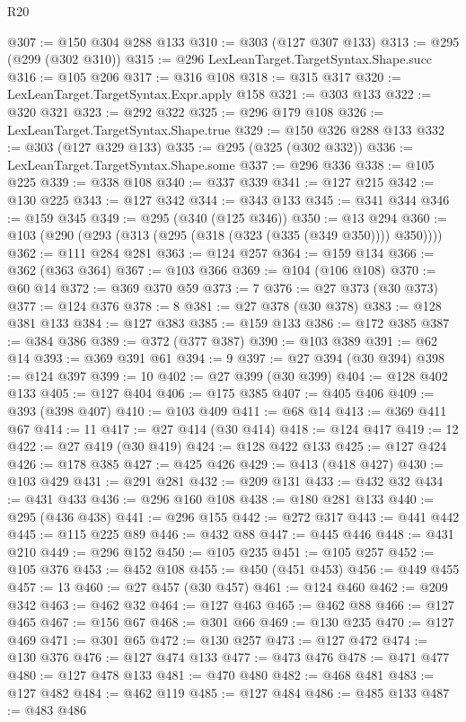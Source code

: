 \begin{lexlean}{R20}
\begin{coremodule}
@307 := @150 @304 @288 @133
@310 := @303 (@127 @307 @133)
@313 := @295 (@299 (@302 @310))
@315 := @296 LexLeanTarget.TargetSyntax.Shape.succ
@316 := @105 @206
@317 := @316 @108
@318 := @315 @317
@320 := LexLeanTarget.TargetSyntax.Expr.apply @158
@321 := @303 @133
@322 := @320 @321
@323 := @292 @322
@325 := @296 @179 @108
@326 := LexLeanTarget.TargetSyntax.Shape.true
@329 := @150 @326 @288 @133
@332 := @303 (@127 @329 @133)
@335 := @295 (@325 (@302 @332))
@336 := LexLeanTarget.TargetSyntax.Shape.some
@337 := @296 @336
@338 := @105 @225
@339 := @338 @108
@340 := @337 @339
@341 := @127 @215
@342 := @130 @225
@343 := @127 @342
@344 := @343 @133
@345 := @341 @344
@346 := @159 @345
@349 := @295 (@340 (@125 @346))
@350 := @13 @294
@360 := @103 (@290 (@293 (@313 (@295 (@318 (@323 (@335 (@349 @350)))) @350))))
@362 := @111 @284 @281
@363 := @124 @257
@364 := @159 @134
@366 := @362 (@363 @364)
@367 := @103 @366
@369 := @104 (@106 @108)
@370 := @60 @14
@372 := @369 @370 @59
@373 := 7
@376 := @27 @373 (@30 @373)
@377 := @124 @376
@378 := 8
@381 := @27 @378 (@30 @378)
@383 := @128 @381 @133
@384 := @127 @383
@385 := @159 @133
@386 := @172 @385
@387 := @384 @386
@389 := @372 (@377 @387)
@390 := @103 @389
@391 := @62 @14
@393 := @369 @391 @61
@394 := 9
@397 := @27 @394 (@30 @394)
@398 := @124 @397
@399 := 10
@402 := @27 @399 (@30 @399)
@404 := @128 @402 @133
@405 := @127 @404
@406 := @175 @385
@407 := @405 @406
@409 := @393 (@398 @407)
@410 := @103 @409
@411 := @68 @14
@413 := @369 @411 @67
@414 := 11
@417 := @27 @414 (@30 @414)
@418 := @124 @417
@419 := 12
@422 := @27 @419 (@30 @419)
@424 := @128 @422 @133
@425 := @127 @424
@426 := @178 @385
@427 := @425 @426
@429 := @413 (@418 @427)
@430 := @103 @429
@431 := @291 @281
@432 := @209 @131
@433 := @432 @32
@434 := @431 @433
@436 := @296 @160 @108
@438 := @180 @281 @133
@440 := @295 (@436 @438)
@441 := @296 @155
@442 := @272 @317
@443 := @441 @442
@445 := @115 @225 @89
@446 := @432 @88
@447 := @445 @446
@448 := @431 @210
@449 := @296 @152
@450 := @105 @235
@451 := @105 @257
@452 := @105 @376
@453 := @452 @108
@455 := @450 (@451 @453)
@456 := @449 @455
@457 := 13
@460 := @27 @457 (@30 @457)
@461 := @124 @460
@462 := @209 @342
@463 := @462 @32
@464 := @127 @463
@465 := @462 @88
@466 := @127 @465
@467 := @156 @67
@468 := @301 @66
@469 := @130 @235
@470 := @127 @469
@471 := @301 @65
@472 := @130 @257
@473 := @127 @472
@474 := @130 @376
@476 := @127 @474 @133
@477 := @473 @476
@478 := @471 @477
@480 := @127 @478 @133
@481 := @470 @480
@482 := @468 @481
@483 := @127 @482
@484 := @462 @119
@485 := @127 @484
@486 := @485 @133
@487 := @483 @486

\end{coremodule}
\end{lexlean}
